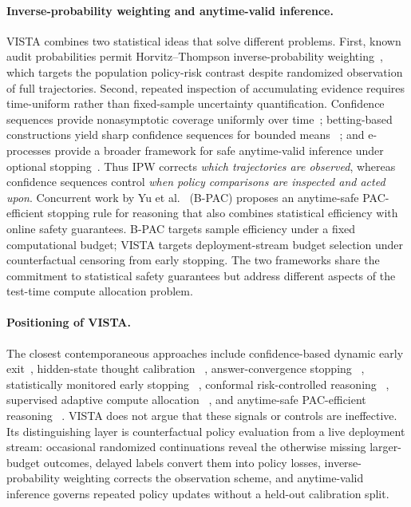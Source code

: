 \documentclass[a4paper,fleqn]{cas-sc}
\theoremstyle{plain}
\theoremstyle{definition}
\theoremstyle{remark}
\begin{document}
\paragraph{Inverse-probability weighting and anytime-valid inference.}
VISTA combines two statistical ideas that solve different problems. First,
known audit probabilities permit Horvitz--Thompson inverse-probability
weighting~\cite{horvitz1952sampling}, which targets the population policy-risk
contrast despite randomized observation of full trajectories. Second, repeated
inspection of accumulating evidence requires time-uniform rather than
fixed-sample uncertainty quantification. Confidence sequences provide
nonasymptotic coverage uniformly over time~\cite{howard2021confidence};
betting-based constructions yield sharp confidence sequences for bounded means
~\cite{waudbysmith2024betting}; and e-processes provide a broader framework for
safe anytime-valid inference under optional stopping~\cite{ramdas2023safe}.
Thus IPW corrects \emph{which trajectories are observed}, whereas confidence
sequences control \emph{when policy comparisons are inspected and acted upon}.
Concurrent work by Yu et al.~\cite{yu2026bpac} (B-PAC) proposes an anytime-safe
PAC-efficient stopping rule for reasoning that also combines statistical
efficiency with online safety guarantees. B-PAC targets sample efficiency under
a fixed computational budget; VISTA targets deployment-stream budget selection
under counterfactual censoring from early stopping. The two frameworks share
the commitment to statistical safety guarantees but address different aspects
of the test-time compute allocation problem.

\paragraph{Positioning of VISTA.}
The closest contemporaneous approaches include confidence-based dynamic early
exit~\cite{yang2026deer}, hidden-state thought calibration
~\cite{wu2025thoughtcalibration}, answer-convergence stopping
~\cite{liu2025answerconvergence}, statistically monitored early stopping
~\cite{xie2026statistical}, conformal risk-controlled reasoning
~\cite{wang2026conformalthinking}, supervised adaptive compute allocation
~\cite{zhai2026adaptive}, and anytime-safe PAC-efficient reasoning
~\cite{yu2026bpac}. VISTA does not argue that these signals or controls
are ineffective. Its distinguishing layer is counterfactual policy evaluation
from a live deployment stream: occasional randomized continuations reveal the
otherwise missing larger-budget outcomes, delayed labels convert them into
policy losses, inverse-probability weighting corrects the observation scheme,
and anytime-valid inference governs repeated policy updates without a held-out
calibration split.
\end{document}
